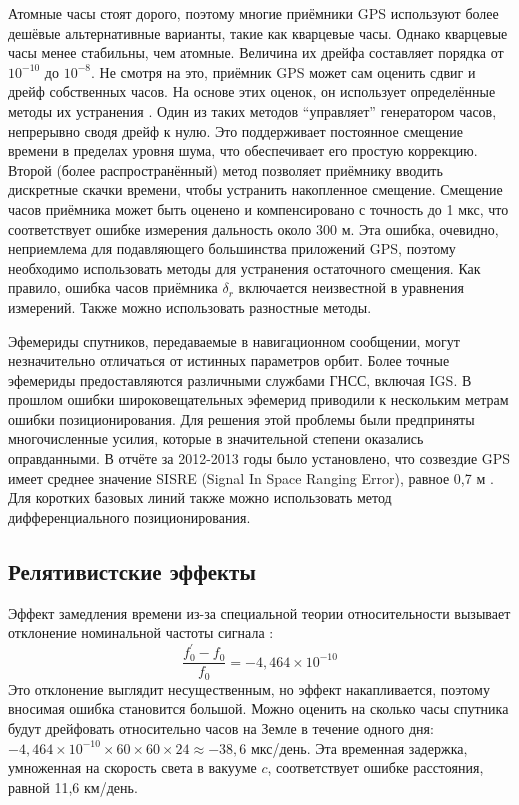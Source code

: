 Атомные часы стоят дорого, поэтому многие приёмники GPS используют более дешёвые альтернативные варианты, такие как кварцевые часы.
Однако кварцевые часы менее стабильны, чем атомные.
Величина их дрейфа составляет порядка от $10^{-10}$ до $10^{-8}$. 
Не смотря на это, приёмник GPS может сам оценить сдвиг и дрейф собственных часов.
На основе этих оценок, он использует определённые методы их устранения \cite{Petovello2011}. 
Один из таких методов ``управляет'' генератором часов, непрерывно сводя дрейф к нулю.
Это поддерживает постоянное смещение времени в пределах уровня шума, что обеспечивает его простую коррекцию.  
Второй (более распространённый) метод позволяет приёмнику вводить дискретные скачки времени, чтобы устранить накопленное смещение.
Смещение часов приёмника может быть оценено и компенсировано с точность до 1 мкс, что соответствует ошибке измерения дальность около 300 м. 
Эта ошибка, очевидно, неприемлема для подавляющего большинства приложений GPS, поэтому необходимо использовать методы для устранения остаточного смещения.
Как правило, ошибка часов приёмника $\delta_r$ включается неизвестной в уравнения измерений.
Также можно использовать разностные методы.

Эфемериды спутников, передаваемые в навигационном сообщении, могут незначительно отличаться от истинных параметров орбит.
Более точные эфемериды предоставляются различными службами ГНСС, включая IGS.
В прошлом ошибки широковещательных эфемерид приводили к нескольким метрам ошибки позиционирования.
Для решения этой проблемы были предприняты многочисленные усилия, которые в значительной степени оказались оправданными.
В отчёте за 2012-2013 годы было установлено, что созвездие GPS имеет среднее значение SISRE (Signal In Space Ranging Error), равное 0,7 м \cite{Montebruck2015}.  
Для коротких базовых линий также можно использовать метод дифференциального позиционирования.

\subsection*{\textbf{Релятивистские эффекты}}

Эффект замедления времени из-за специальной теории относительности вызывает отклонение номинальной частоты сигнала \cite{Hofmann2008}:
\begin{equation}
\frac{f_0^{'}-f_0}{f_0}=-4,464\times10^{-10}    
\end{equation}
Это отклонение выглядит несущественным, но эффект накапливается, поэтому вносимая ошибка становится большой.
Можно оценить на сколько часы спутника будут дрейфовать относительно часов на Земле в течение одного дня: $-4,464\times10^{-10}\times60\times60\times24\approx-38,6$ мкс/день.
Эта временная задержка, умноженная на скорость света в вакууме $c$, соответствует ошибке расстояния, равной 11,6 км/день. 

